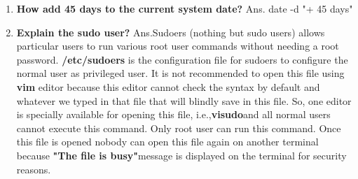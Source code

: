 \begin{enumerate}
    \bigskip
    \bigskip

    \item\textbf{How add 45 days to the current system date?}
    \newline
    Ans. date   -d    "+  45 days"
   
    \bigskip
    \bigskip

    \item\textbf{Explain the sudo user?}
    \newline
    Ans.Sudoers (nothing but sudo users) allows particular users to run various root user commands without needing a root password. 
    \textbf{/etc/sudoers} is the configuration file for sudoers to configure the normal user as privileged user.
    It is not recommended to open this file using \textbf{vim }   editor because this editor cannot check the syntax by default and whatever we typed in that file that will blindly save in this file.
    So, one editor is specially available for opening this file, i.e.,\textbf{visudo}and all normal users cannot execute this command. Only root user can run this command.
    Once this file is opened nobody can open this file again on another terminal because \textbf{"The file is busy"}message is displayed on the terminal for security reasons.
    
    \bigskip
    \bigskip


\end{enumerate}
